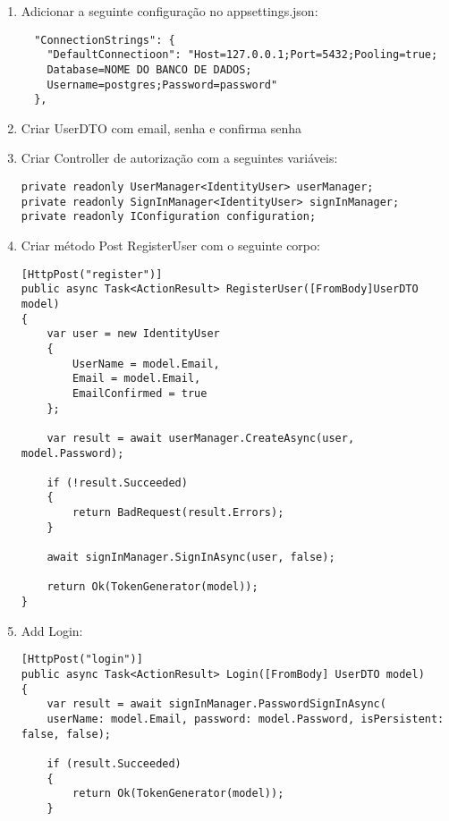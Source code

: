 \documentclass{article}
\begin{document}
\begin{enumerate}
    \item Adicionar a seguinte configuração no appsettings.json:
    
    \begin{verbatim}
  "ConnectionStrings": {
    "DefaultConnectioon": "Host=127.0.0.1;Port=5432;Pooling=true;
    Database=NOME DO BANCO DE DADOS;
    Username=postgres;Password=password"
  },
    \end{verbatim}
    
    \item Criar UserDTO com email, senha e confirma senha
    
    \item Criar Controller de autorização com a seguintes variáveis:
    
    \begin{verbatim}
private readonly UserManager<IdentityUser> userManager;
private readonly SignInManager<IdentityUser> signInManager;
private readonly IConfiguration configuration;
    \end{verbatim}
    
    \item Criar método Post RegisterUser com o seguinte corpo:
    
    \begin{verbatim}
[HttpPost("register")]
public async Task<ActionResult> RegisterUser([FromBody]UserDTO model)
{
    var user = new IdentityUser
    {
        UserName = model.Email,
        Email = model.Email,
        EmailConfirmed = true
    };

    var result = await userManager.CreateAsync(user, model.Password);

    if (!result.Succeeded)
    {
        return BadRequest(result.Errors);
    }

    await signInManager.SignInAsync(user, false);

    return Ok(TokenGenerator(model));
}
    \end{verbatim}
    
    \item Add Login:
    
    \begin{verbatim}
[HttpPost("login")]
public async Task<ActionResult> Login([FromBody] UserDTO model)
{
    var result = await signInManager.PasswordSignInAsync(
    userName: model.Email, password: model.Password, isPersistent: false, false);

    if (result.Succeeded)
    {
        return Ok(TokenGenerator(model));
    }


\end{verbatim}
\end{enumerate}
\end{document}
